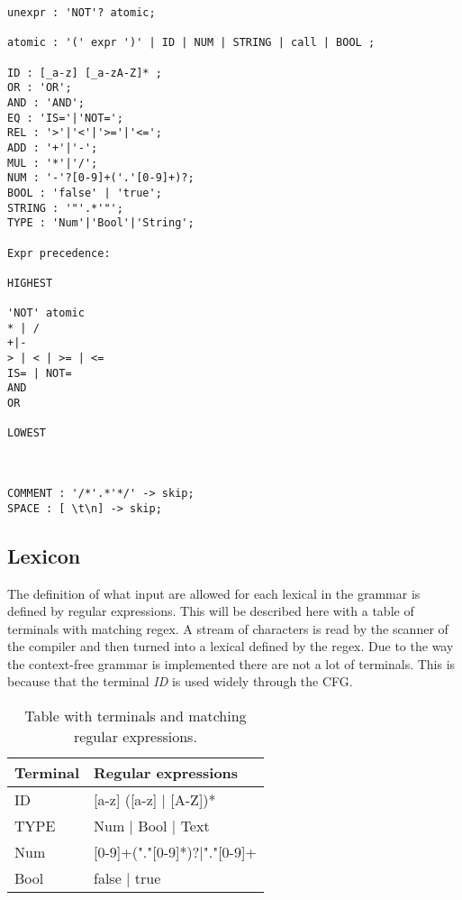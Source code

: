 \begin{lstlisting}[style=MyLang]
unexpr : 'NOT'? atomic;

atomic : '(' expr ')' | ID | NUM | STRING | call | BOOL ;

ID : [_a-z] [_a-zA-Z]* ;
OR : 'OR';
AND : 'AND';
EQ : 'IS='|'NOT=';
REL : '>'|'<'|'>='|'<=';
ADD : '+'|'-';
MUL : '*'|'/';
NUM : '-'?[0-9]+('.'[0-9]+)?;
BOOL : 'false' | 'true';
STRING : '"'.*'"';
TYPE : 'Num'|'Bool'|'String';

Expr precedence:
 
HIGHEST
 
'NOT' atomic
* | /
+|-
> | < | >= | <=
IS= | NOT=
AND
OR
 
LOWEST



COMMENT : '/*'.*'*/' -> skip;
SPACE : [ \t\n] -> skip;

\end{lstlisting}


\subsection{Lexicon}
The definition of what input are allowed for each lexical in the grammar is defined by regular expressions. This will be described here with a table of terminals with matching regex. A stream of characters is read by the scanner of the compiler and then turned into a lexical defined by the regex.
Due to the way the context-free grammar is implemented there are not a lot of terminals. This is because that the terminal \emph{ID} is used widely through the CFG.  

\begin{table}[]
\centering
\label{fig:Lexicon}
\begin{tabular}{|l|l|}
\hline
Terminal & Regular expressions                \\ \hline
ID       & {[}a-z{]} ({[}a-z{]} | {[}A-Z{]})* \\ \hline
TYPE     & Num | Bool | Text                  \\ \hline
Num		 & [0-9]+("."[0-9]*)?|"."[0-9]+		  \\ \hline
Bool 	 & false | true						  \\ \hline
\end{tabular}
\caption{Table with terminals and matching regular expressions.}
\end{table}
